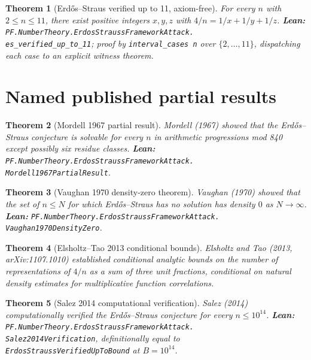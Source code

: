 \documentclass[11pt,a4paper]{article}
\theoremstyle{plain}
\newtheorem{theorem}{Theorem}[section]
\theoremstyle{definition}
\begin{document}
\begin{theorem}[Erd\H{o}s--Straus verified up to 11, axiom-free]
\label{thm:verified-11}
For every $n$ with $2 \le n \le 11$, there exist positive integers
$x, y, z$ with $4/n = 1/x + 1/y + 1/z$.
\textbf{Lean:}
\texttt{PF.NumberTheory.ErdosStraussFrameworkAttack.\\
es\_verified\_up\_to\_11};
proof by \texttt{interval\_cases n} over $\{2, \ldots, 11\}$, dispatching
each case to an explicit witness theorem.
\end{theorem}

\section{Named published partial results}
\label{sec:partials}

\begin{theorem}[Mordell 1967 partial result]
\label{thm:mordell}
Mordell (1967) showed that the Erd\H{o}s--Straus conjecture is solvable
for every $n$ in arithmetic progressions mod 840 except possibly six
residue classes.
\textbf{Lean:}
\texttt{PF.NumberTheory.ErdosStraussFrameworkAttack.\\
Mordell1967PartialResult}.
\end{theorem}

\begin{theorem}[Vaughan 1970 density-zero theorem]
\label{thm:vaughan}
Vaughan (1970) showed that the set of $n \le N$ for which
Erd\H{o}s--Straus has no solution has density $0$ as $N \to \infty$.
\textbf{Lean:}
\texttt{PF.NumberTheory.ErdosStraussFrameworkAttack.\\
Vaughan1970DensityZero}.
\end{theorem}

\begin{theorem}[Elsholtz--Tao 2013 conditional bounds]
\label{thm:elsholtz-tao}
Elsholtz and Tao (2013, arXiv:1107.1010) established conditional
analytic bounds on the number of representations of $4/n$ as a sum of
three unit fractions, conditional on natural density estimates for
multiplicative function correlations.
\end{theorem}

\begin{theorem}[Salez 2014 computational verification]
\label{thm:salez}
Salez (2014) computationally verified the Erd\H{o}s--Straus conjecture
for every $n \le 10^{14}$.
\textbf{Lean:}
\texttt{PF.NumberTheory.ErdosStraussFrameworkAttack.\\
Salez2014Verification}, definitionally equal to
\texttt{ErdosStraussVerifiedUpToBound} at $B = 10^{14}$.
\end{theorem}
\end{document}
